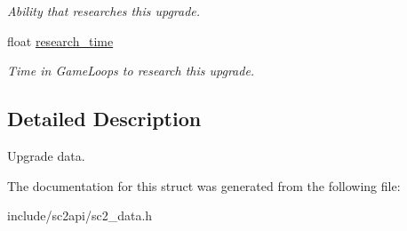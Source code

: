 \begin{DoxyCompactItemize}
\begin{DoxyCompactList}\small\item\em Ability that researches this upgrade. \end{DoxyCompactList}\item 
\mbox{\label{structsc2_1_1_upgrade_data_a5be26db3c987d0bc79345ea2e0387ac6}} 
float \hyperlink{structsc2_1_1_upgrade_data_a5be26db3c987d0bc79345ea2e0387ac6}{research\+\_\+time}
\begin{DoxyCompactList}\small\item\em Time in Game\+Loops to research this upgrade. \end{DoxyCompactList}\end{DoxyCompactItemize}


\subsection{Detailed Description}
Upgrade data. 

The documentation for this struct was generated from the following file\+:\begin{DoxyCompactItemize}
\item 
include/sc2api/sc2\+\_\+data.\+h\end{DoxyCompactItemize}
